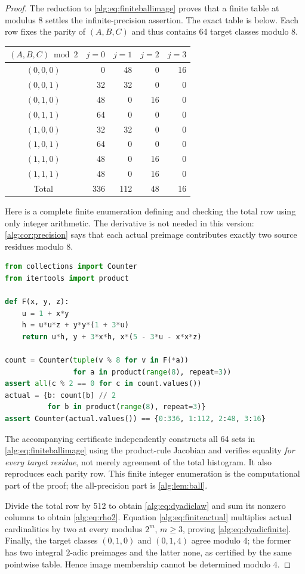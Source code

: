 \documentclass[11pt]{article}
\numberwithin{equation}{section}
\theoremstyle{plain}
\theoremstyle{plain}
\theoremstyle{plain}
\theoremstyle{definition}
\theoremstyle{definition}
\theoremstyle{definition}
\theoremstyle{remark}
\begin{document}
\begin{proof}
The reduction to \eqref{alg:eq:finiteballimage} proves that a finite table
at modulus $8$ settles the infinite-precision assertion. The exact table
is below. Each row fixes the parity of $(A,B,C)$ and thus contains 64
target classes modulo $8$.
\begin{center}
\begin{tabular}{c r r r r}
\toprule
$(A,B,C)\bmod2$ & $j=0$ & $j=1$ & $j=2$ & $j=3$\\
\midrule
$(0,0,0)$&0&48&0&16\\
$(0,0,1)$&32&32&0&0\\
$(0,1,0)$&48&0&16&0\\
$(0,1,1)$&64&0&0&0\\
$(1,0,0)$&32&32&0&0\\
$(1,0,1)$&64&0&0&0\\
$(1,1,0)$&48&0&16&0\\
$(1,1,1)$&48&0&16&0\\
\midrule
Total&336&112&48&16\\
\bottomrule
\end{tabular}
\end{center}
Here is a complete finite enumeration defining and checking the total
row using only integer arithmetic. The derivative is not needed in this
version: \cref{alg:cor:precision} says that each actual preimage contributes
exactly two source residues modulo $8$.
\begin{lstlisting}[language=Python]
from collections import Counter
from itertools import product

def F(x, y, z):
    u = 1 + x*y
    h = u*u*z + y*y*(1 + 3*u)
    return u*h, y + 3*x*h, x*(5 - 3*u - x*x*z)

count = Counter(tuple(v % 8 for v in F(*a))
                for a in product(range(8), repeat=3))
assert all(c % 2 == 0 for c in count.values())
actual = {b: count[b] // 2
          for b in product(range(8), repeat=3)}
assert Counter(actual.values()) == {0:336, 1:112, 2:48, 3:16}
\end{lstlisting}
The accompanying certificate independently constructs all 64 sets in
\eqref{alg:eq:finiteballimage} using the product-rule Jacobian and verifies
equality \emph{for every target residue}, not merely agreement of the
total histogram. It also reproduces each parity row. This finite integer
enumeration is the computational part of the proof; the all-precision
part is \cref{alg:lem:ball}.

Divide the total row by 512 to obtain \eqref{alg:eq:dyadiclaw} and sum its
nonzero columns to obtain \eqref{alg:eq:rho2}. Equation
\eqref{alg:eq:finiteactual} multiplies actual cardinalities by two at every
modulus $2^m$, $m\ge3$, proving \eqref{alg:eq:dyadicfinite}.
Finally, the target classes $(0,1,0)$ and $(0,1,4)$ agree modulo $4$;
the former has two integral $2$-adic preimages and the latter none,
as certified by the same pointwise table. Hence image membership
cannot be determined modulo $4$.
\end{proof}
\end{document}
